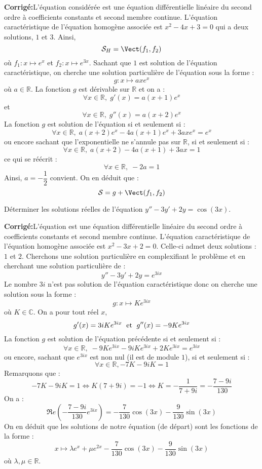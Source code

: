 \documentclass[a4paper,twoside,french,11pt]{VcCours}
\newcommand{\corr}{\textbf{Corrigé:}}
\begin{document}
\corr L'équation considérée est une équation différentielle linéaire du second ordre à coefficients constants et second membre continue. L'équation caractéristique de l'équation homogène associée est $x^2-4x+3=0$ qui a deux solutions, $1$ et $3$. Ainsi,
$$ \mathcal{S}_H = \Vect(f_1,f_2)$$
où $f_1 : x \mapsto e^x$ et $f_2 : x \mapsto e^{3x}$. Sachant que $1$ est solution de l'équation caractéristique, on cherche une solution particulière de l'équation sous la forme :
$$ g : x \mapsto a x e^x$$
où $a \in \mathbb{R}$. La fonction $g$ est dérivable sur $\mathbb{R}$ et on a :
$$ \forall x \in \mathbb{R}, \; g'(x) = a (x+1)e^x$$
et
$$ \forall x \in \mathbb{R}, \; g''(x) = a (x+2)e^x$$
La fonction $g$ est solution de l'équation si et seulement si :
$$ \forall x \in \mathbb{R}, \;  a (x+2)e^x - 4a (x+1)e^x + 3axe^x = e^x$$
ou encore sachant que l'exponentielle ne s'annule pas sur $\mathbb{R}$, si et seulement si :
$$ \forall x \in \mathbb{R}, \; a (x+2) - 4a (x+1) + 3ax = 1$$
ce qui se réécrit :
$$  \forall x \in \mathbb{R}, \; -2a=1$$
Ainsi, $a= -\dfrac{1}{2}$ convient. On en déduit que :
$$ \mathcal{S} = g +  \Vect(f_1,f_2)$$

\begin{Exercice}{} Déterminer les solutions réelles de l'équation $y'' - 3y' + 2y = \cos(3x)$.
\end{Exercice}

\corr L'équation est une équation différentielle linéaire du second ordre à coefficients constants et second membre continue. L'équation caractéristique de l'équation homogène associée est $x^2-3x+2=0$. Celle-ci admet deux solutions : $1$ et $2$. Cherchons une solution particulière en \og complexifiant \fg le problème et en cherchant une solution particulière de :
$$  y'' - 3y' + 2y = e^{3ix}$$
Le nombre $3i$ n'est pas solution de l'équation caractéristique donc on cherche une solution sous la forme :
$$ g : x \mapsto K e^{3ix}$$
où $K \in \mathbb{C}$. On a pour tout réel $x$,
$$ g'(x) = 3iK e^{3ix} \; \hbox{ et } \; g''(x) = -9K e^{3ix}$$
La fonction $g$ est solution de l'équation précédente si et seulement si :
$$ \forall x \in \mathbb{R}, \;   -9K e^{3ix} - 9iK e^{3ix} + 2K e^{3ix} = e^{3ix}$$
ou encore, sachant que $e^{3ix}$ est non nul (il est de module $1$), si et seulement si :
$$  \forall x \in \mathbb{R},  -7K - 9iK =1$$
Remarquons que :
$$ -7K - 9iK =1 \Longleftrightarrow K(7+9i) = -1 \Longleftrightarrow K = -\dfrac{1}{7+9i} =     -  \dfrac{7-9i}{130}$$
On a :
$$ \Re e \left(-  \dfrac{7-9i}{130} e^{3ix} \right) = - \dfrac{7}{130} \cos(3x) - \dfrac{9}{130} \sin(3x)$$
On en déduit que les solutions de notre équation (de départ) sont les fonctions de la forme :
$$ x \mapsto \lambda e^{x} + \mu e^{2x} - \dfrac{7}{130} \cos(3x) - \dfrac{9}{130} \sin(3x)$$
où $\lambda, \mu \in \mathbb{R}$.
\end{document}
